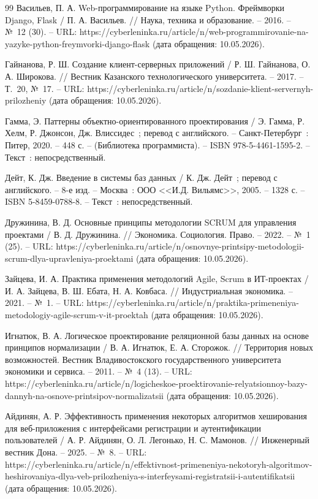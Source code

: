 \begin{thebibliography}{99}
	 Васильев, П. А. Web-программирование на языке Python. Фреймворки Django, Flask / П. А. Васильев. // Наука, техника и образование. -- 2016. -- №~12 (30). -- URL: https://cyberleninka.ru/article/n/web-programmirovanie-na-yazyke-python-freymvorki-django-flask (дата обращения: 10.05.2026).

	 Гайнанова, Р. Ш. Создание клиент-серверных приложений / Р. Ш. Гайнанова, О. А. Широкова. // Вестник Казанского технологического университета. -- 2017. -- Т.~20, №~17. -- URL: https://cyberleninka.ru/article/n/sozdanie-klient-servernyh-prilozheniy (дата обращения: 10.05.2026).

	 Гамма, Э. Паттерны объектно-ориентированного проектирования / Э. Гамма, Р. Хелм, Р. Джонсон, Дж. Влиссидес~; перевод с английского. -- Санкт-Петербург~: Питер, 2020. -- 448 с. -- (Библиотека программиста). -- ISBN 978-5-4461-1595-2. -- Текст~: непосредственный.

	 Дейт, К. Дж. Введение в системы баз данных / К. Дж. Дейт~; перевод с английского. -- 8-е изд. -- Москва~: ООО <<И.Д. Вильямс>>, 2005. -- 1328 с. -- ISBN 5-8459-0788-8. -- Текст~: непосредственный.

	 Дружинина, В. Д. Основные принципы методологии SCRUM для управления проектами / В. Д. Дружинина. // Экономика. Социология. Право. -- 2022. -- №~1 (25). -- URL: https://cyberleninka.ru/article/n/osnovnye-printsipy-metodologii-scrum-dlya-upravleniya-proektami (дата обращения: 10.05.2026).

	 Зайцева, И. А. Практика применения методологий Agile, Scrum в ИТ-проектах / И. А. Зайцева, В. Ш. Ебата, Н. А. Ковбаса. // Индустриальная экономика. -- 2021. -- №~1. -- URL: https://cyberleninka.ru/article/n/praktika-primeneniya-metodologiy-agile-scrum-v-it-proektah (дата обращения: 10.05.2026).

	 Игнатюк, В. А. Логическое проектирование реляционной базы данных на основе принципов нормализации / В. А. Игнатюк, Е. А. Сторожок. // Территория новых возможностей. Вестник Владивостокского государственного университета экономики и сервиса. -- 2011. -- №~4 (13). -- URL: https://cyberleninka.ru/article/n/logicheskoe-proektirovanie-relyatsionnoy-bazy-dannyh-na-osnove-printsipov-normalizatsii (дата обращения: 10.05.2026).

	 Айдинян, А. Р. Эффективность применения некоторых алгоритмов хеширования для веб-приложения с интерфейсами регистрации и аутентификации пользователей / А. Р. Айдинян, О. Л. Легонько, Н. С. Мамонов. // Инженерный вестник Дона. -- 2025. -- №~8. -- URL: https://cyberleninka.ru/article/n/effektivnost-primeneniya-nekotoryh-algoritmov-heshirovaniya-dlya-veb-prilozheniya-s-interfeysami-registratsii-i-autentifikatsii (дата обращения: 10.05.2026).


\end{thebibliography}

